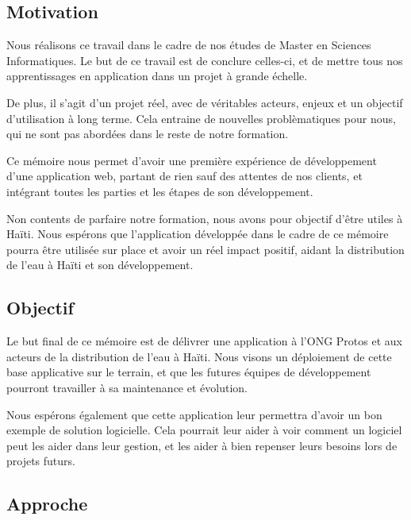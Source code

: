 \documentclass{EPL-master-thesis-covers-FR}
\begin{document}
		\subsection*{Motivation}

			Nous réalisons ce travail dans le cadre de nos études de Master en Sciences Informatiques. Le but de ce travail est de conclure celles-ci, et de mettre tous nos apprentissages en application dans un projet à grande échelle.

			De plus, il s'agit d'un projet réel, avec de véritables acteurs, enjeux et un objectif d'utilisation à long terme. Cela entraine de nouvelles problèmatiques pour nous, qui ne sont pas abordées dans le reste de notre formation.

			Ce mémoire nous permet d'avoir une première expérience de développement d'une application web, partant de rien sauf des attentes de nos clients, et intégrant toutes les parties et les étapes de son développement.

			Non contents de parfaire notre formation, nous avons pour objectif d'être utiles à Haïti. Nous espérons que l'application développée dans le cadre de ce mémoire pourra être utilisée sur place et avoir un réel impact positif, aidant la distribution de l'eau à Haïti et son développement.

		\subsection*{Objectif}

			Le but final de ce mémoire est de délivrer une application à l'ONG Protos et aux acteurs de la distribution de l'eau à Haïti. Nous visons un déploiement de cette base applicative sur le terrain, et que les futures équipes de développement pourront travailler à sa maintenance et évolution.

			Nous espérons également que cette application leur permettra d'avoir un bon exemple de solution logicielle. Cela pourrait leur aider à voir comment un logiciel peut les aider dans leur gestion, et les aider à bien repenser leurs besoins lors de projets futurs.

		\subsection*{Approche}
\end{document}
